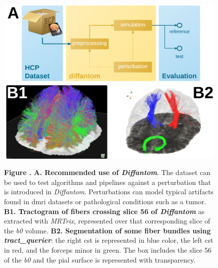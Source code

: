 \documentclass[english]{frontiers/frontiersSCNS} %
\begin{document}
\begin{figure}[h!]
\begin{center}
\includegraphics[width=\linewidth]{figures/figure02}
\end{center}
\textbf{\label{fig:figure2} Figure . }%
{\textbf{A. Recommended use of \emph{Diffantom}}.
The dataset can be used to test algorithms and pipelines against a perturbation that is
  introduced in \emph{Diffantom}.
Perturbations can model typical artifacts found in \gls*{dmri} datasets or pathological conditions
  such as a tumor.
\textbf{B1. Tractogram of fibers crossing slice 56 of \emph{Diffantom}} as extracted with \emph{MRTrix},
  represented over that corresponding slice of the \emph{b0} volume.
\textbf{B2. Segmentation of some fiber bundles using \emph{tract\_querier}}: the right \gls*{cst} is
  represented in blue color, the left \gls*{cst} in red, and the forceps minor in green.
  The box includes the slice 56 of the \emph{b0} and the pial surface is represented with transparency.
}
\end{figure}
\end{document}
